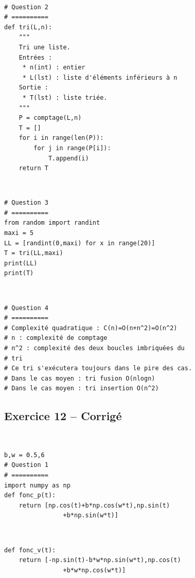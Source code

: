 \documentclass[10pt,fleqn]{article} %
\begin{document}
\begin{corrige}
$\quad$
\begin{lstlisting}
# Question 2
# ==========
def tri(L,n):
    """
    Tri une liste.
    Entrées :
     * n(int) : entier
     * L(lst) : liste d'éléments inférieurs à n
    Sortie : 
     * T(lst) : liste triée.
    """
    P = comptage(L,n)
    T = []
    for i in range(len(P)):
        for j in range(P[i]):
            T.append(i)
    return T
\end{lstlisting}
\end{corrige}

\begin{corrige}
$\quad$
\begin{lstlisting}
# Question 3
# ==========
from random import randint
maxi = 5
LL = [randint(0,maxi) for x in range(20)]
T = tri(LL,maxi)
print(LL)
print(T)
\end{lstlisting}
\end{corrige}

\begin{corrige}
$\quad$
\begin{lstlisting}
# Question 4
# ==========
# Complexité quadratique : C(n)=O(n+n^2)=O(n^2)
# n : complexité de comptage
# n^2 : complexité des deux boucles imbriquées du 
# tri
# Ce tri s'exécutera toujours dans le pire des cas.
# Dans le cas moyen : tri fusion O(nlogn)
# Dans le cas moyen : tri insertion O(n^2)
\end{lstlisting}
\end{corrige}
 

\subsection*{Exercice 12 -- Corrigé}

\begin{corrige}
$\quad$
\begin{lstlisting}
b,w = 0.5,6
# Question 1 
# ==========
import numpy as np
def fonc_p(t):
    return [np.cos(t)+b*np.cos(w*t),np.sin(t)
    			+b*np.sin(w*t)]
\end{lstlisting}
\end{corrige}

\begin{corrige}
$\quad$
\begin{lstlisting}
def fonc_v(t):
    return [-np.sin(t)-b*w*np.sin(w*t),np.cos(t)
    			+b*w*np.cos(w*t)]
\end{lstlisting}
\end{corrige}
\end{document}
